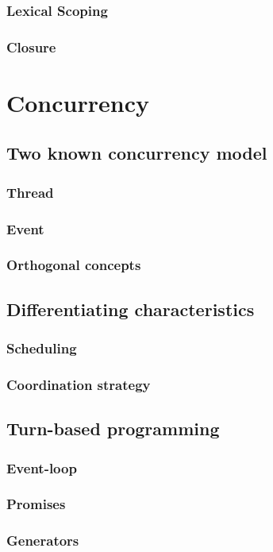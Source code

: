 \documentclass[12pt]{report}
\begin{document}
      \subsubsection{Lexical Scoping}
      \subsubsection{Closure}

  \section{Concurrency}
    \subsection{Two known concurrency model}
      \subsubsection{Thread}
      \subsubsection{Event}
      \subsubsection{Orthogonal concepts}
    \subsection{Differentiating characteristics}
      \subsubsection{Scheduling}
      \subsubsection{Coordination strategy}
    \subsection{Turn-based programming}
      \subsubsection{Event-loop}
      \subsubsection{Promises}
      \subsubsection{Generators}
\end{document}

